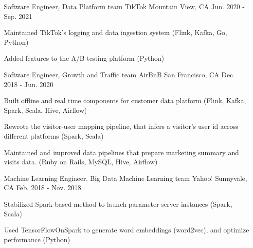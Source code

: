 

\begin{cventries}

  \cventry
    {Software Engineer, Data Platform team} %
    {TikTok} %
    {Mountain View, CA} %
    {Jun. 2020 - Sep. 2021} %
    {
      \begin{cvitems} %
        \item {Maintained TikTok's logging and data ingestion system (Flink, Kafka, Go, Python)}
        \item {Added features to the A/B testing platform (Python)}
      \end{cvitems}
    }

  \cventry
    {Software Engineer, Growth and Traffic team} %
    {AirBnB} %
    {San Francisco, CA} %
    {Dec. 2018 - Jun. 2020} %
    {
      \begin{cvitems} %
        \item {Built offline and real time components for customer data platform (Flink, Kafka, Spark, Scala, Hive, Airflow)}
        \item {Rewrote the visitor-user mapping pipeline, that infers a visitor's user id across different platforms (Spark, Scala)}
        \item {Maintained and improved data pipelines that prepare marketing summary and visits data. (Ruby on Rails, MySQL, Hive, Airflow)}
      \end{cvitems}
    }

  \cventry
    {Machine Learning Engineer, Big Data Machine Learning team} %
    {Yahoo!} %
    {Sunnyvale, CA} %
    {Feb. 2018 - Nov. 2018} %
    {
      \begin{cvitems} %
        \item {Stabilized Spark based method to launch parameter server instances (Spark, Scala)}
        \item {Used TensorFlowOnSpark to generate word embeddings (word2vec), and optimize performance (Python)}
      \end{cvitems}
    }


\end{cventries}
